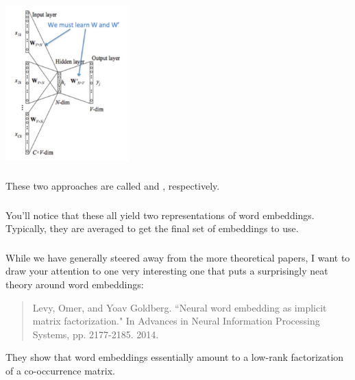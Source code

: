 \documentclass[xetex,mathserif,serif,aspectratio=169]{beamer}
\begin{document}
\begin{frame}[fragile] \frametitle{} \oldB \small

\begin{center}
\includegraphics[height=6cm]{img/continuousBagOfWords2.jpg}
\end{center}

\end{frame}

\begin{frame}[fragile] \frametitle{} \oldB \small

These two approaches are called  and
, respectively.

\end{frame}

\begin{frame}[fragile] \frametitle{} \oldB \small

You'll notice that these all yield two representations of
word embeddings. Typically, they are averaged to get the
final set of embeddings to use.

\end{frame}

\begin{frame}[fragile] \frametitle{} \oldB \small

While we have generally steered away from the more theoretical
papers, I want to draw your attention to one very interesting
one that puts a surprisingly neat theory around word embeddings:
\begin{quote}
Levy, Omer, and Yoav Goldberg. ``Neural word embedding as
implicit matrix factorization." In Advances in Neural
Information Processing Systems, pp. 2177-2185. 2014.
\end{quote}
They show that word embeddings essentially amount to a low-rank
factorization of a co-occurrence matrix.

\end{frame}
\end{document}
